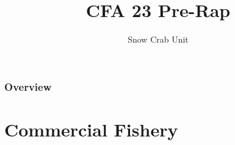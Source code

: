 \documentclass{beamer}
\title[Science / Industry Pre-Rap]{CFA 23 Pre-Rap} %
\author{Snow Crab Unit} %
\institute[DFO] %
{
	Department of Fisheries and Oceans \\ %
	\medskip
	\textit{} %
}
\date{\the\year} %
\begin{document}
	
	\begin{frame}
		\titlepage %
	\end{frame}
	
	\begin{frame}
		\frametitle{Overview} %
		\tableofcontents%
	\end{frame}
	
	
	
	\section{Commercial Fishery}
	
\end{document}
